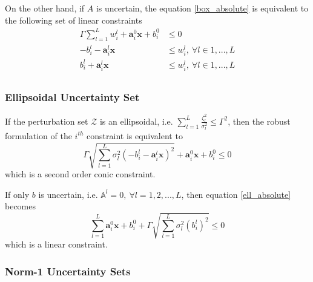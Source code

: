 On the other hand, if $A$ is uncertain, the equation \eqref{box_absolute} is equivalent to the following set of linear constraints
\begin{equation}
    \label{box_linear}
    \begin{split}
        \Gamma \textstyle{\sum}_{l=1}^L w^l_{i} + \mathbf{a}^0_{i}\mathbf{x} + b^0_{i} &\leq 0 \\
        - b^l_{i} - \mathbf{a}^l_{i}\mathbf{x} &\leq w^l_{i},~\forall l \in 1,...,L\\
        b^l_{i} + \mathbf{a}^l_{i}\mathbf{x} &\leq w^l_{i},~\forall l \in 1,...,L\\
    \end{split}
\end{equation}

\subsubsection{Ellipsoidal Uncertainty Set}
If the perturbation set $\mathcal{Z}$ is an ellipsoidal, i.e. $\textstyle{\sum}_{l=1}^L\frac{\zeta_l^2}{\sigma_l^2} \leq \Gamma^2$,
then the robust formulation of the $i^{th}$ constraint is equivalent to
\begin{equation}
    \Gamma \sqrt{\textstyle{\sum}_{l=1}^L \sigma_l^2(- b^l_{i} - \mathbf{a}^l_{i}\mathbf{x})^2} + \mathbf{a}^0_{i}\mathbf{x} + b^0_{i} \leq 0
    \label{ell_absolute}
\end{equation}
which is a second order conic constraint.

If only $b$ is uncertain, i.e. $\mathbb{A}^l = 0,~\forall l = 1,2,...,L$, then equation \eqref{ell_absolute} becomes
\begin{equation}
    \textstyle{\sum}_{l=1}^L \mathbf{a}^0_{i}\mathbf{x} + b^0_{i} + \Gamma \sqrt{\textstyle{\sum}_{l=1}^L \sigma_l^2(b^l_{i})^2} \leq 0
    \label{ell_coeff}
\end{equation}
which is a linear constraint.

\subsubsection{Norm-1 Uncertainty Sets}

